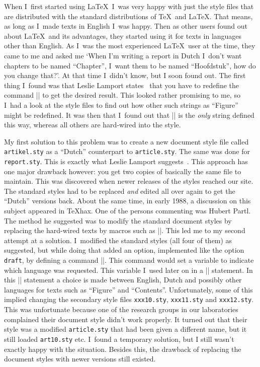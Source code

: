 \documentclass{ltugboat}
\newcommand\TeXhax{\TeX hax}}
\newcommand{\file}[1]{\texttt{#1}}
\begin{document}
When I~first started using \LaTeX\ I~was very happy with just the
style files that are distributed with the standard distributions of
\TeX\ and \LaTeX. That means, as long as I~made texts in English I~was
happy. Then as other users found out about \LaTeX\ and its advantages,
they started using it for texts in languages other than English. As
I~was the most experienced \LaTeX\ user at the time, they came to me
and asked me `When I'm writing a report in Dutch I~don't want chapters
to be named ``Chapter'', I~want them to be named ``Hoofdstuk'', how do
you change that?'. At that time I~didn't know, but I soon found out.
The first thing I~found was that Leslie Lamport states~\cite[pages
85--86]{LLbook} that you have to redefine the command |\@chapapp|
to get the desired result. This looked rather promising to me, so
I~had a look at the style files to find out how other such strings as
``Figure'' might be redefined. It was then that I~found out that
|\@chapapp| is the \emph{only} string defined this way, whereas
all others are hard-wired into the style.

My first solution to this problem was to create a new document style
file called \file{artikel.sty} as a ``Dutch'' counterpart to
\file{article.sty}. The same was done for \file{report.sty}. This is
exactly what Leslie Lamport suggests~\cite{LLth}.  This approach has
one major drawback however: you get two copies of basically the same
file to maintain. This was discovered when newer releases of the
styles reached our site.  The standard styles had to be replaced
\emph{and} edited all over again to get the ``Dutch'' versions back.
About the same time, in early 1988, a discussion on this subject
appeared in \TeXhax. One of the persons commenting was Hubert Partl.
The method he suggested was to modify the standard document styles by
replacing the hard-wired texts by macros such as |\@chapapp|.  This
led me to my second attempt at a solution.  I~modified the standard
styles (all four of them) as suggested, but while doing that added an
option, implemented like the option \texttt{draft}, by defining a
command |\ds@dutch|. This command would set a variable to indicate
which language was requested.  This variable I~used later on in a
|\case| statement. In this |\case| statement a choice is made between
English, Dutch and possibly other languages for texts such as
``Figure'' and ``Contents''.  Unfortunately, some of this implied
changing the secondary style files \file{xxx10.sty}, \file{xxx11.sty}
and \file{xxx12.sty}.  This was unfortunate because one of the
research groups in our laboratories complained their document style
didn't work properly.  It turned out that their style was a modified
\file{article.sty} that had been given a different name, but it still
loaded \file{art10.sty} etc.  I~found a temporary solution, but I
still wasn't exactly happy with the situation. Besides this, the
drawback of replacing the document styles with newer versions still
existed.
\end{document}
